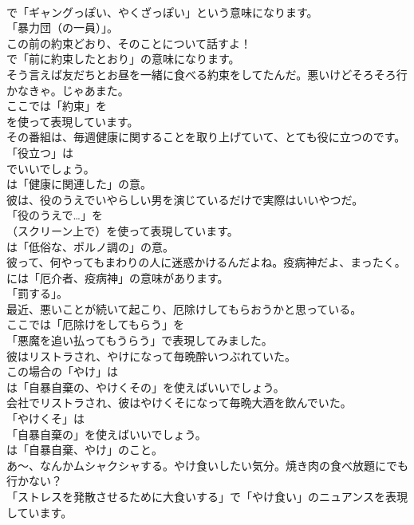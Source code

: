 \documentclass[8pt]{extreport}
\begin{document}
\begin{CJK}{UTF8}{min}
\\	で「ギャングっぽい、やくざっぽい」という意味になります。
\\	「暴力団（の一員）」。	
\\	この前の約束どおり、そのことについて話すよ！ 
\\	で「前に約束したとおり」の意味になります。	
\\	そう言えば友だちとお昼を一緒に食べる約束をしてたんだ。悪いけどそろそろ行かなきゃ。じゃあまた。 
\\	ここでは「約束」を 
\\	を使って表現しています。	
\\	その番組は、毎週健康に関することを取り上げていて、とても役に立つのです。 
\\	「役立つ」は 
\\	でいいでしょう。
\\	は「健康に関連した」の意。	
\\	彼は、役のうえでいやらしい男を演じているだけで実際はいいやつだ。 
\\	「役のうえで…」を 
\\	（スクリーン上で）を使って表現しています。
\\	は「低俗な、ポルノ調の」の意。	
\\	彼って、何やってもまわりの人に迷惑かけるんだよね。疫病神だよ、まったく。 
\\	には「厄介者、疫病神」の意味があります。
\\	「罰する」。	
\\	最近、悪いことが続いて起こり、厄除けしてもらおうかと思っている。 
\\	ここでは「厄除けをしてもらう」を
\\	「悪魔を追い払ってもうらう」で表現してみました。	
\\	彼はリストラされ、やけになって毎晩酔いつぶれていた。 
\\	この場合の「やけ」は
\\	は「自暴自棄の、やけくその」を使えばいいでしょう。	
\\	会社でリストラされ、彼はやけくそになって毎晩大酒を飲んでいた。 
\\	「やけくそ」は
\\	「自暴自棄の」を使えばいいでしょう。
\\	は「自暴自棄、やけ」のこと。	
\\	あ～、なんかムシャクシャする。やけ食いしたい気分。焼き肉の食べ放題にでも行かない？ 
\\	「ストレスを発散させるために大食いする」で「やけ食い」のニュアンスを表現しています。

\end{CJK}
\end{document}

